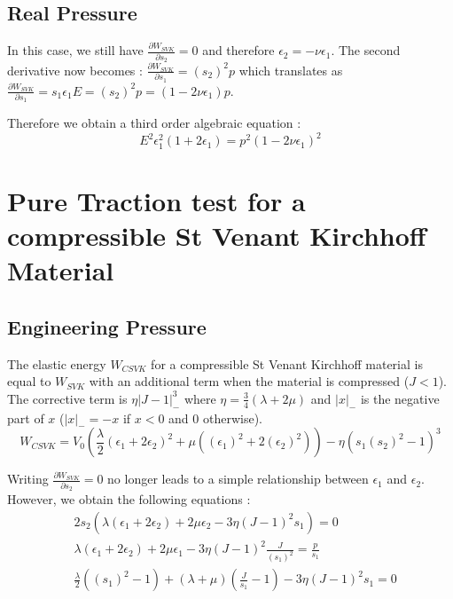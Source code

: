 \documentclass[a4paper,11pt]{article}
\begin{document}
\subsection{Real Pressure}

In this case, we still have $\frac{\partial W_{SVK}}{\partial s_2} =0$ and therefore $\epsilon_2 = -\nu \epsilon_1$.
The second derivative now becomes : $\frac{\partial W_{SVK}}{\partial s_1}=(s_2)^2 p$ which translates as 
$\frac{\partial W_{SVK}}{\partial s_1}=s_1 \epsilon_1 E=(s_2)^2 p=(1-2\nu\epsilon_1)p$. 

Therefore we obtain a third order algebraic equation :
\[
E^2 \epsilon_1^2(1+2\epsilon_1)=p^2(1-2\nu\epsilon_1)^2
\]


\section{Pure Traction test for a compressible St Venant Kirchhoff Material}

\subsection{Engineering Pressure}
The elastic energy $W_{CSVK}$ for a compressible St Venant Kirchhoff material is equal to $W_{SVK}$ with an additional term when the material is compressed ($J<1$).
The corrective term is $ \eta |J-1|^3_{-}$ where $\eta=\frac{3}{4}(\lambda+2\mu)$ and $|x|_{-}$ is the negative part of $x$ ($|x|_{-}= -x$ if $x<0$ and $0$ otherwise).
\[
W_{CSVK}=V_0 (\frac{\lambda}{2}  (\epsilon_1+2 \epsilon_2)^2 +\mu ((\epsilon_1)^2+2 (\epsilon_2)^2)) -\eta (s_1 (s_2)^2-1)^3
\]

Writing  $\frac{\partial W_{SVK}}{\partial s_2}=0$ no longer leads to a simple relationship between $\epsilon_1$ and $\epsilon_2$. However, we obtain the following equations :
\begin{align}
&2 s_2 \left (\lambda (\epsilon_1 + 2 \epsilon_2) + 2\mu \epsilon_2 - 3\eta (J-1)^2 s_1 \right )=0 \nonumber \\
& \lambda (\epsilon_1 + 2 \epsilon_2) + 2\mu \epsilon_1 - 3\eta (J-1)^2 \frac{J}{(s_1)^2} = \frac{p}{s_1} \label{eq;csvk-p} \\
& \frac{\lambda}{2} ((s_1)^2-1)  + (\lambda+\mu) (\frac{J}{s_1} -1) - 3\eta (J-1)^2 s_1 =0 \label{eq;csvk}
\end{align}
\end{document}
